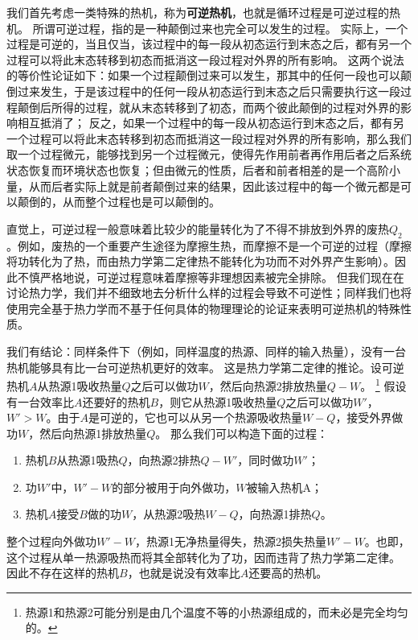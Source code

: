 \documentclass[hyperref, UTF8, a4paper]{ctexart}
\begin{document}
我们首先考虑一类特殊的热机，称为\textbf{可逆热机}，也就是循环过程是可逆过程的热机。
所谓可逆过程，指的是一种颠倒过来也完全可以发生的过程。
实际上，一个过程是可逆的，当且仅当，该过程中的每一段从初态运行到末态之后，都有另一个过程可以将此末态转移到初态而抵消这一段过程对外界的所有影响。
这两个说法的等价性论证如下：如果一个过程颠倒过来可以发生，那其中的任何一段也可以颠倒过来发生，于是该过程中的任何一段从初态运行到末态之后只需要执行这一段过程颠倒后所得的过程，就从末态转移到了初态，而两个彼此颠倒的过程对外界的影响相互抵消了；
反之，如果一个过程中的每一段从初态运行到末态之后，都有另一个过程可以将此末态转移到初态而抵消这一段过程对外界的所有影响，那么我们取一个过程微元，能够找到另一个过程微元，使得先作用前者再作用后者之后系统状态恢复而环境状态也恢复；但由微元的性质，后者和前者相差的是一个高阶小量，从而后者实际上就是前者颠倒过来的结果，因此该过程中的每一个微元都是可以颠倒的，从而整个过程也是可以颠倒的。

直觉上，可逆过程一般意味着比较少的能量转化为了不得不排放到外界的废热$Q_2$。例如，废热的一个重要产生途径为摩擦生热，而摩擦不是一个可逆的过程（摩擦将功转化为了热，而由热力学第二定律热不能转化为功而不对外界产生影响）。因此不慎严格地说，可逆过程意味着摩擦等非理想因素被完全排除。
但我们现在在讨论热力学，我们并不细致地去分析什么样的过程会导致不可逆性；同样我们也将使用完全基于热力学而不基于任何具体的物理理论的论证来表明可逆热机的特殊性质。

我们有结论：同样条件下（例如，同样温度的热源、同样的输入热量），没有一台热机能够具有比一台可逆热机更好的效率。
这是热力学第二定律的推论。设可逆热机$A$从热源1吸收热量$Q$之后可以做功$W$，然后向热源2排放热量$Q-W$。%
\footnote{热源1和热源2可能分别是由几个温度不等的小热源组成的，而未必是完全均匀的。}%
假设有一台效率比$A$还要好的热机$B$，则它从热源1吸收热量$Q$之后可以做功$W'$，$W'>W$。由于$A$是可逆的，它也可以从另一个热源吸收热量$W-Q$，接受外界做功$W$，然后向热源1排放热量$Q$。
那么我们可以构造下面的过程：
\begin{enumerate}
    \item 热机$B$从热源1吸热$Q$，向热源2排热$Q-W'$，同时做功$W'$；
    \item 功$W'$中，$W'-W$的部分被用于向外做功，$W$被输入热机A；
    \item 热机$A$接受$B$做的功$W$，从热源2吸热$W-Q$，向热源1排热$Q$。
\end{enumerate}
整个过程向外做功$W'-W$，热源1无净热量得失，热源2损失热量$W'-W$。也即，这个过程从单一热源吸热而将其全部转化为了功，因而违背了热力学第二定律。
因此不存在这样的热机$B$，也就是说没有效率比$A$还要高的热机。
\end{document}
